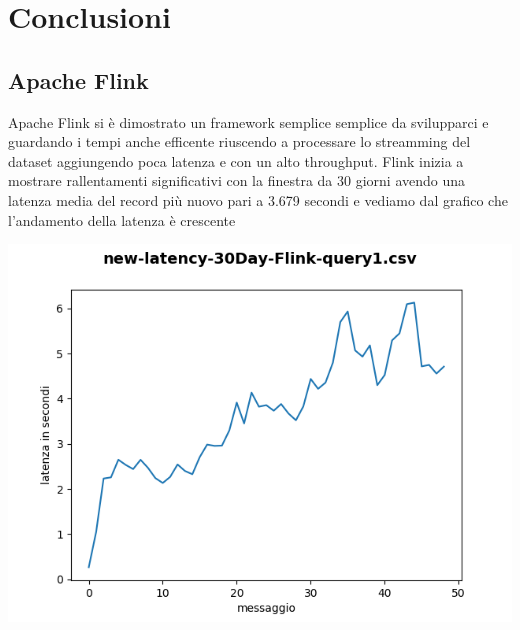 \documentclass[acmsmall]{acmart}
\begin{document}
\section{Conclusioni}
\subsection{Apache Flink}

Apache Flink si è dimostrato un framework semplice semplice da svilupparci e guardando i tempi anche  efficente riuscendo a processare lo streamming del dataset aggiungendo poca latenza e con un alto throughput.
Flink inizia a mostrare rallentamenti significativi con la finestra da 30 giorni avendo una latenza media del record più nuovo pari a 3.679 secondi e vediamo dal grafico che l'andamento della latenza è crescente

\includegraphics[width=14cm]{../results/tempi/new-latency-30Day-Flink-query1.csv.png}
\end{document}
